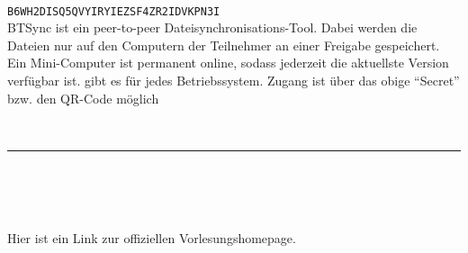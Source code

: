\begin{minipage}{4cm}
\end{minipage}
\hfill
\begin{minipage}{\dieBreite}
	\\
	\texttt{B6WH2DISQ5QVYIRYIEZSF4ZR2IDVKPN3I} \smallskip\\
	BTSync ist ein peer-to-peer Dateisynchronisations-Tool. Dabei werden die Dateien nur auf den Computern der Teilnehmer an einer Freigabe gespeichert. Ein Mini-Computer ist permanent 
	online, sodass jederzeit die aktuellste Version verfügbar ist.  gibt es für jedes Betriebssystem.
	Zugang ist über das obige \enquote{Secret} bzw. den QR-Code möglich
\end{minipage}\\[0.7cm]
\hrule \mbox{ }\\[0.7cm]
\begin{minipage}{4cm}
	\qrcode[height=3.3cm, version=6]{\homepage}
\end{minipage}
\hfill
\begin{minipage}{\dieBreite}
	\\
	\resizebox{\dieBreite}{!}{\footnotesize\url{\homepage}}\smallskip\\
	Hier ist ein Link zur offiziellen Vorlesungshomepage.
\end{minipage}
\newpage
